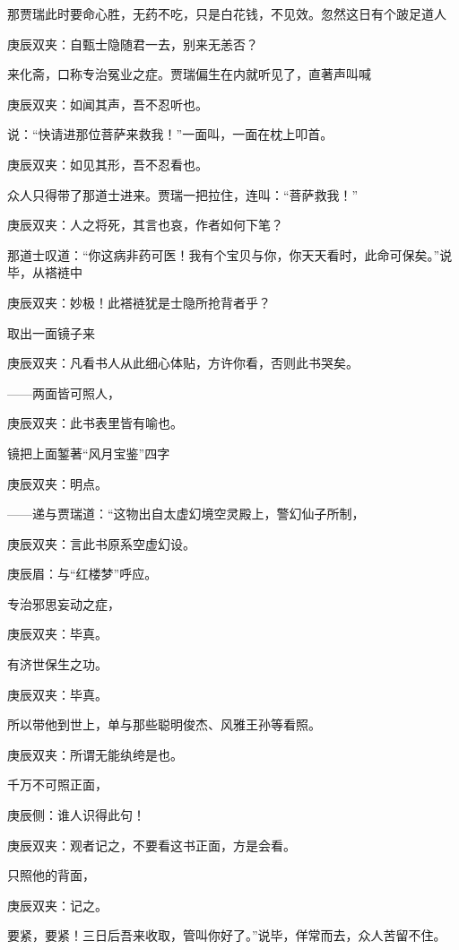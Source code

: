 \begin{parag}
    那贾瑞此时要命心胜，无药不吃，只是白花钱，不见效。忽然这日有个跛足道人\begin{note}庚辰双夹：自甄士隐随君一去，别来无恙否？\end{note}来化斋，口称专治冤业之症。贾瑞偏生在内就听见了，直著声叫喊\begin{note}庚辰双夹：如闻其声，吾不忍听也。\end{note}说：“快请进那位菩萨来救我！”一面叫，一面在枕上叩首。\begin{note}庚辰双夹：如见其形，吾不忍看也。\end{note}众人只得带了那道士进来。贾瑞一把拉住，连叫：“菩萨救我！”\begin{note}庚辰双夹：人之将死，其言也哀，作者如何下笔？\end{note}那道士叹道：“你这病非药可医！我有个宝贝与你，你天天看时，此命可保矣。”说毕，从褡裢中\begin{note}庚辰双夹：妙极！此褡裢犹是士隐所抢背者乎？\end{note}取出一面镜子来\begin{note}庚辰双夹：凡看书人从此细心体贴，方许你看，否则此书哭矣。\end{note}——两面皆可照人，\begin{note}庚辰双夹：此书表里皆有喻也。\end{note}镜把上面錾著“风月宝鉴”四字\begin{note}庚辰双夹：明点。\end{note}——递与贾瑞道：“这物出自太虚幻境空灵殿上，警幻仙子所制，\begin{note}庚辰双夹：言此书原系空虚幻设。\end{note}\begin{note}庚辰眉：与“红楼梦”呼应。\end{note}专治邪思妄动之症，\begin{note}庚辰双夹：毕真。\end{note}有济世保生之功。\begin{note}庚辰双夹：毕真。\end{note}所以带他到世上，单与那些聪明俊杰、风雅王孙等看照。\begin{note}庚辰双夹：所谓无能纨绔是也。\end{note}千万不可照正面，\begin{note}庚辰侧：谁人识得此句！\end{note}\begin{note}庚辰双夹：观者记之，不要看这书正面，方是会看。\end{note}只照他的背面，\begin{note}庚辰双夹：记之。\end{note}要紧，要紧！三日后吾来收取，管叫你好了。”说毕，佯常而去，众人苦留不住。
\end{parag}


